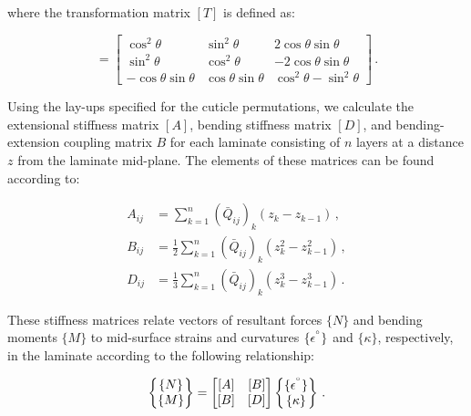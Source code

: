 \documentclass[twocolumn, linenumbers, superscriptaddress]{revtex4-1}
\begin{document}
				where the transformation matrix $[T]$ is defined as:
				
				\begin{equation}
				[T] =
				 \begin{bmatrix}
					 \cos^2\theta & \sin^2\theta & 2\cos\theta\sin\theta \\
					 \sin^2\theta & \cos^2\theta & -2\cos\theta\sin\theta \\
					 -\cos\theta\sin\theta & \cos\theta\sin\theta & \cos^2\theta - \sin^2\theta
				 \end{bmatrix}\,.
				\end{equation}
				
				Using the lay-ups specified for the cuticle permutations, we calculate the extensional stiffness matrix $[A]$, bending stiffness matrix $[D]$, and bending-extension coupling matrix $B$ for each laminate consisting of $n$ layers at a distance $z$ from the laminate mid-plane.
				The elements of these matrices can be found according to:
				
				\begin{equation}
					\begin{aligned}
						A_{ij} & = \sum_{k = 1}^{n}(\bar{Q}_{ij})_k(z_{k} - z_{k-1})\,, \\
						B_{ij} & = \frac{1}{2}\sum_{k = 1}^{n}(\bar{Q}_{ij})_k(z^2_{k} - z^2_{k-1})\,, \\
						D_{ij} & = \frac{1}{3}\sum_{k = 1}^{n}(\bar{Q}_{ij})_k(z^3_{k} - z^3_{k-1})\,.
					\end{aligned}
				\end{equation}
				
				These stiffness matrices relate vectors of resultant forces $\{N\}$ and bending moments $\{M\}$ to mid-surface strains and curvatures $\{\epsilon^{\degree}\}$ and $\{\kappa\}$, respectively, in the laminate according to the following relationship:
				
				\begin{equation}
					\begin{Bmatrix}
						\{N\} \\
						\{M\}
					\end{Bmatrix}
					=
					\begin{bmatrix}
						[A] & [B] \\
						[B] & [D]
					\end{bmatrix}
					\begin{Bmatrix}
					\{\epsilon^{\degree}\} \\
					\{\kappa\}
					\end{Bmatrix}\,.
				\end{equation}
				
\end{document}
